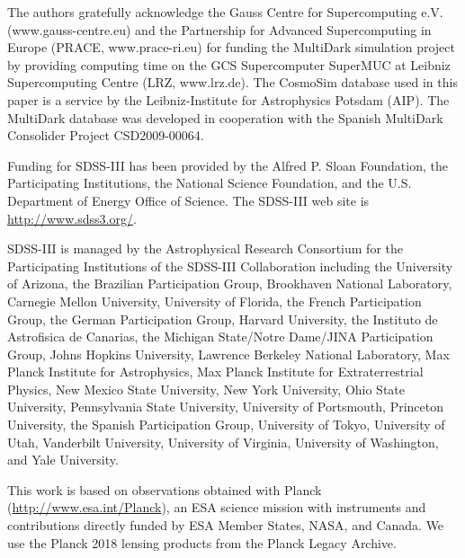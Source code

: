 \documentclass[twocolumn,anonymous,linenumbers]{aastex701}
\begin{document}
\begin{acknowledgments}

The authors gratefully acknowledge the Gauss Centre for Supercomputing e.V. (www.gauss-centre.eu) and the Partnership for Advanced Supercomputing in Europe (PRACE, www.prace-ri.eu) for funding the MultiDark simulation project by providing computing time on the GCS Supercomputer SuperMUC at Leibniz Supercomputing Centre (LRZ, www.lrz.de). The CosmoSim database used in this paper is a service by the Leibniz-Institute for Astrophysics Potsdam (AIP). The MultiDark database was developed in cooperation with the Spanish MultiDark Consolider Project CSD2009-00064.

Funding for SDSS-III has been provided by the Alfred P. Sloan Foundation, the Participating Institutions, the National Science Foundation, and the U.S. Department of Energy Office of Science. The SDSS-III web site is \url{http://www.sdss3.org/}.

SDSS-III is managed by the Astrophysical Research Consortium for the Participating Institutions of the SDSS-III Collaboration including the University of Arizona, the Brazilian Participation Group, Brookhaven National Laboratory, Carnegie Mellon University, University of Florida, the French Participation Group, the German Participation Group, Harvard University, the Instituto de Astrofisica de Canarias, the Michigan State/Notre Dame/JINA Participation Group, Johns Hopkins University, Lawrence Berkeley National Laboratory, Max Planck Institute for Astrophysics, Max Planck Institute for Extraterrestrial Physics, New Mexico State University, New York University, Ohio State University, Pennsylvania State University, University of Portsmouth, Princeton University, the Spanish Participation Group, University of Tokyo, University of Utah, Vanderbilt University, University of Virginia, University of Washington, and Yale University. 

This work is based on observations obtained with Planck
(\url{http://www.esa.int/Planck}), an ESA science mission with instruments
and contributions directly funded by ESA Member States, NASA, and Canada.
We use the Planck 2018 lensing products from the Planck Legacy Archive.

\end{acknowledgments}





{}

\end{document}

